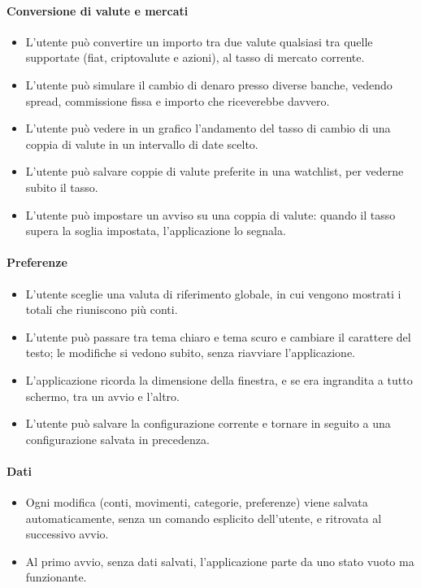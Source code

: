 \documentclass[11pt,a4paper,openright]{report}
\begin{document}
\paragraph{Conversione di valute e mercati}
\begin{itemize}
  \item L'utente può convertire un importo tra due valute qualsiasi tra quelle supportate (fiat,
  criptovalute e azioni), al tasso di mercato corrente.
  \item L'utente può simulare il cambio di denaro presso diverse banche, vedendo spread, commissione fissa
  e importo che riceverebbe davvero.
  \item L'utente può vedere in un grafico l'andamento del tasso di cambio di una coppia di valute in un
  intervallo di date scelto.
  \item L'utente può salvare coppie di valute preferite in una watchlist, per vederne subito il tasso.
  \item L'utente può impostare un avviso su una coppia di valute: quando il tasso supera la soglia
  impostata, l'applicazione lo segnala.
\end{itemize}

\paragraph{Preferenze}
\begin{itemize}
  \item L'utente sceglie una valuta di riferimento globale, in cui vengono mostrati i totali che
  riuniscono più conti.
  \item L'utente può passare tra tema chiaro e tema scuro e cambiare il carattere del testo; le modifiche
    si vedono subito, senza riavviare l'applicazione.
  \item L'applicazione ricorda la dimensione della finestra, e se era ingrandita a tutto schermo, tra un avvio e l'altro.
  \item L'utente può salvare la configurazione corrente e tornare in seguito a una configurazione
  salvata in precedenza.
\end{itemize}

\paragraph{Dati}
\begin{itemize}
  \item Ogni modifica (conti, movimenti, categorie, preferenze) viene salvata automaticamente, senza
  un comando esplicito dell'utente, e ritrovata al successivo avvio.
  \item Al primo avvio, senza dati salvati, l'applicazione parte da uno stato vuoto ma funzionante.
\end{itemize}
\end{document}
